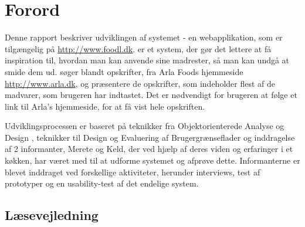 \chapter*{Forord}
Denne rapport beskriver udviklingen af systemet \Foodl{} - en webapplikation, som er tilgængelig på \url{http://www.foodl.dk}. \Foodl{} er et system, der gør det lettere at få inspiration til, hvordan man kan anvende sine madrester, så man kan undgå at smide dem ud. \Foodl{} søger blandt opskrifter, fra Arla Foods hjemmeside \url{http://www.arla.dk}, og præsentere de opskrifter, som indeholder flest af de madvarer, som brugeren har indtastet. Det er nødvendigt for brugeren at følge et link til Arla's hjemmeside, for at få vist hele opskriften.

Udviklingsprocessen er baseret på teknikker fra Objektorienterede Analyse og Design \cite{ooad}, teknikker til Design og Evaluering af Brugergrænseflader \cite{deb} og inddragelse af 2 informanter, Merete og Keld, der ved hjælp af deres viden og erfaringer i et køkken, har været med til at udforme systemet og afprøve dette. Informanterne er blevet inddraget ved forskellige aktiviteter, herunder interviews, test af prototyper og en usability-test af det endelige system.

\section*{Læsevejledning}
